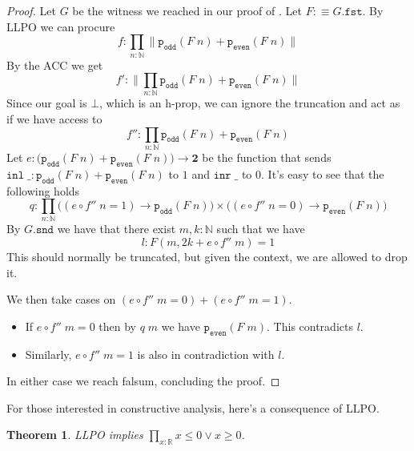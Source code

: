 \documentclass[12pt]{report}
\newtheorem{thm}{Theorem}[chapter]
\theoremstyle{definition}
\begin{document}
\begin{proof}
Let $G$ be the witness we reached in our proof of . 
Let $F :\equiv G.\mathtt{fst}$. 
By LLPO we can procure 
$$f : \prod_{n : \mathbb{N}} \lVert \mathtt{p_{odd}}(F\; n) + \mathtt{p_{even}}(F\;n) \rVert$$
By the ACC we get
$$f' : \big\lVert \prod_{n : \mathbb{N}}  \mathtt{p_{odd}}(F\; n) + \mathtt{p_{even}}(F\;n) \big\rVert$$
Since our goal is $\bot$, which is an h-prop, we can ignore the truncation and act as if we have access to
$$f'' : \prod_{n : \mathbb{N}}  \mathtt{p_{odd}}(F\; n) + \mathtt{p_{even}}(F\;n)$$
Let $e : \big( \mathtt{p_{odd}}(F\; n) + \mathtt{p_{even}}(F\;n)\big) \rightarrow \mathbf{2}$ be the function that sends $\mathtt{inl}\; \_ : \mathtt{p_{odd}}(F\; n) + \mathtt{p_{even}}(F\;n)$
to $1$ and $\mathtt{inr}\; \_$ to $0$. 
It's easy to see that the following holds
$$q : \prod_{n : \mathbb{N}} \big( (e\circ f''\; n = 1) \rightarrow \mathtt{p_{odd}}(F\; n) \big) \times \big( (e\circ f''\; n = 0) \rightarrow \mathtt{p_{even}}(F\; n) \big)$$
By $G.\mathtt{snd}$ we have that there exist $m,k : \mathbb{N}$ such that we have 
$$l : F(m, 2k + e\circ f''\; m) = 1$$
This should normally be truncated, but given the context, we are allowed to drop it. 

We then take cases on $(e\circ f''\; m = 0) + (e\circ f''\; m = 1)$. 
\begin{itemize}
	\item If $e\circ f''\; m = 0$ then by $q\; m$ we have $\mathtt{p_{even}}(F\; m)$. 
	This contradicts $l$. 
	\item Similarly, $e\circ f''\; m = 1$ is also in contradiction with $l$.
\end{itemize}
In either case we reach falsum, concluding the proof.
\end{proof}
For those interested in constructive analysis, here's a consequence of LLPO. 
\begin{thm}
LLPO implies $\prod_{x : \mathbb{R}}x \leq 0 \vee x \geq 0$.
\end{thm}
\end{document}

